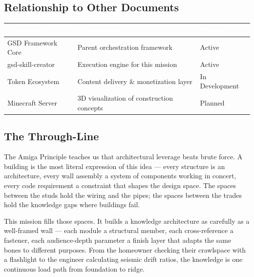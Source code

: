 \documentclass[11pt,letterpaper]{article}
\newcommand{\stageheader}[2]{%
  \noindent\colorbox{#2}{\makebox[\textwidth][l]{%
    \textcolor{white}{\bfseries\sffamily\hspace{6pt}#1\hspace{6pt}}}}%
  \vspace{0.5em}\par%
}
\newcommand{\tableheader}[1]{\textbf{\sffamily\textcolor{white}{#1}}}
\begin{document}
\subsection{Relationship to Other Documents}

\begin{center}
\begin{tabularx}{\textwidth}{L{4cm}XC{2.5cm}}
\toprule
{}
\tableheader{Document} & \tableheader{Relationship} & \tableheader{Status} \\
\midrule
GSD Framework Core & Parent orchestration framework & Active \\
gsd-skill-creator & Execution engine for this mission & Active \\
Token Ecosystem & Content delivery \& monetization layer & In Development \\
Minecraft Server & 3D visualization of construction concepts & Planned \\
\bottomrule
\end{tabularx}
\end{center}

\subsection{The Through-Line}

The Amiga Principle teaches us that architectural leverage beats brute force. A building is the most literal expression of this idea --- every structure is an architecture, every wall assembly a system of components working in concert, every code requirement a constraint that shapes the design space. The spaces between the studs hold the wiring and the pipes; the spaces between the trades hold the knowledge gaps where buildings fail.

This mission fills those spaces. It builds a knowledge architecture as carefully as a well-framed wall --- each module a structural member, each cross-reference a fastener, each audience-depth parameter a finish layer that adapts the same bones to different purposes. From the homeowner checking their crawlspace with a flashlight to the engineer calculating seismic drift ratios, the knowledge is one continuous load path from foundation to ridge.

\newpage

\stageheader{STAGE 2 --- RESEARCH REFERENCE}{secondary}
\end{document}
